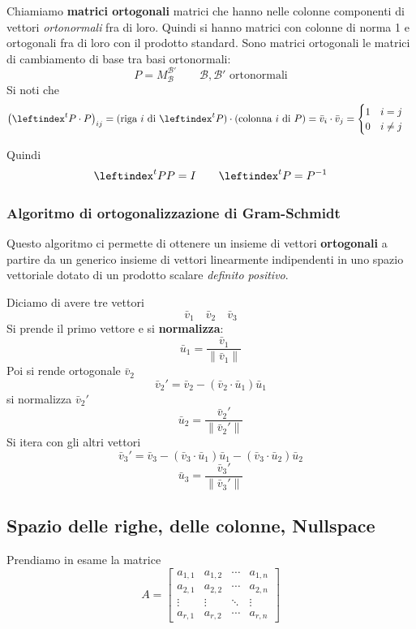 \documentclass[x11names]{article}
\begin{document}
\noindent
Chiamiamo \textbf{matrici ortogonali} matrici che hanno nelle colonne componenti di vettori \textit{ortonormali} fra di loro. Quindi si hanno matrici con colonne di norma 1 e ortogonali fra di loro con il prodotto standard. Sono matrici ortogonali le matrici di cambiamento di base tra basi ortonormali:
\[
P = M^{\mathcal{B}'}_{\mathcal{B}} \qquad \mathcal{B},\mathcal{B}' \text{ ortonormali}
\]
Si noti che 
\[
\left(\leftindex^{t}{P}\cdot P\right)_{ij} = (\text{riga } i \text{ di } \leftindex^{t}{P}) \cdot (\text{colonna } i \text{ di } P) = \bar{v}_{i} \cdot \bar{v}_{j} = \begin{cases}
	1 \quad i = j\\
	0 \quad i \neq j
\end{cases}
\] 

Quindi
\[
\leftindex^{t}{P}P = I \qquad \leftindex^{t}{P} = P^{-1}
\]

\subsubsection{Algoritmo di ortogonalizzazione di Gram-Schmidt }
Questo algoritmo ci permette di ottenere un insieme di vettori \textbf{ortogonali} a partire da un generico insieme di vettori linearmente indipendenti in uno spazio vettoriale dotato di un prodotto scalare \textit{definito positivo}.

\noindent
Diciamo di avere tre vettori
\[
\bar{v}_{1} \quad \bar{v}_{2} \quad \bar{v}_{3}
\]
Si prende il primo vettore e si \textbf{normalizza}:
\[
\bar{u}_{1} = \frac{\bar{v}_{1}}{\|\bar{v}_{1}\|}
\]
Poi si rende ortogonale $\bar{v}_{2}$
\[
\bar{v}_{2}' = \bar{v}_{2} - \left(\bar{v}_{2} \cdot \bar{u}_{1}\right)\bar{u}_{1}
\]
si normalizza $\bar{v}_{2}'$
\[
\bar{u}_{2} = \frac{\bar{v}_{2}'}{\|\bar{v}_{2}'\|}
\]
Si itera con gli altri vettori
\[
\bar{v}_{3}' = \bar{v}_{3} - \left(\bar{v}_{3} \cdot \bar{u}_{1}\right)\bar{u}_{1} - \left(\bar{v}_{3} \cdot \bar{u}_{2}\right)\bar{u}_{2}
\]
\[
\bar{u}_{3} = \frac{\bar{v}_{3}'}{\|\bar{v}_{3}'\|}
\]


\subsection{Spazio delle righe, delle colonne, Nullspace}
Prendiamo in esame la matrice
\[
A=
\begin{bmatrix}a_{1,1}&a_{1,2}&\cdots &a_{1,n}\\a_{2,1}&a_{2,2}&\cdots &a_{2,n}\\ \vdots &\vdots &\ddots &\vdots \\a_{r,1}&a_{r,2}&\cdots &a_{r,n}\end{bmatrix}
\] 
\end{document}
